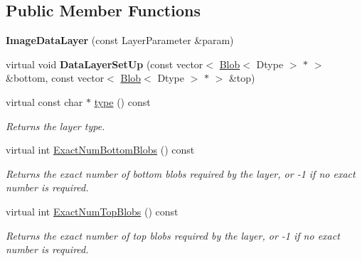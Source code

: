\subsection*{Public Member Functions}
\begin{DoxyCompactItemize}
\item 
{\bfseries Image\+Data\+Layer} (const Layer\+Parameter \&param)\hypertarget{classcaffe_1_1ImageDataLayer_a2319914181470f8ecd80ffb63d0daec9}{}\label{classcaffe_1_1ImageDataLayer_a2319914181470f8ecd80ffb63d0daec9}

\item 
virtual void {\bfseries Data\+Layer\+Set\+Up} (const vector$<$ \hyperlink{classcaffe_1_1Blob}{Blob}$<$ Dtype $>$ $\ast$ $>$ \&bottom, const vector$<$ \hyperlink{classcaffe_1_1Blob}{Blob}$<$ Dtype $>$ $\ast$ $>$ \&top)\hypertarget{classcaffe_1_1ImageDataLayer_a954e5e3c15c5081569957ded2289cce7}{}\label{classcaffe_1_1ImageDataLayer_a954e5e3c15c5081569957ded2289cce7}

\item 
virtual const char $\ast$ \hyperlink{classcaffe_1_1ImageDataLayer_a5de0c6d7b276d1c540ef7288741a7530}{type} () const \hypertarget{classcaffe_1_1ImageDataLayer_a5de0c6d7b276d1c540ef7288741a7530}{}\label{classcaffe_1_1ImageDataLayer_a5de0c6d7b276d1c540ef7288741a7530}

\begin{DoxyCompactList}\small\item\em Returns the layer type. \end{DoxyCompactList}\item 
virtual int \hyperlink{classcaffe_1_1ImageDataLayer_a95155f868560cf481138deb7a999ee08}{Exact\+Num\+Bottom\+Blobs} () const 
\begin{DoxyCompactList}\small\item\em Returns the exact number of bottom blobs required by the layer, or -\/1 if no exact number is required. \end{DoxyCompactList}\item 
virtual int \hyperlink{classcaffe_1_1ImageDataLayer_a288e0fe3bca4334100e077bc0ad20c60}{Exact\+Num\+Top\+Blobs} () const 
\begin{DoxyCompactList}\small\item\em Returns the exact number of top blobs required by the layer, or -\/1 if no exact number is required. \end{DoxyCompactList}\end{DoxyCompactItemize}
